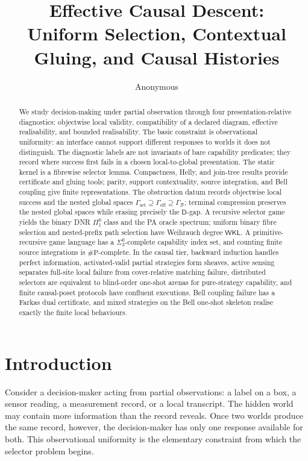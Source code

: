 \documentclass[11pt]{article}
\title{Effective Causal Descent:\\ Uniform Selection, Contextual Gluing, and Causal Histories}
\author{Anonymous}
\date{}
\theoremstyle{plain}
\theoremstyle{definition}
\theoremstyle{remark}
\begin{document}
\maketitle

\begin{abstract}
We study decision-making under partial observation through four
presentation-relative diagnostics: objectwise local validity, compatibility of a
declared diagram, effective realisability, and bounded realisability. The basic
constraint is observational uniformity: an interface cannot support different
responses to worlds it does not distinguish. The diagnostic labels are not
invariants of bare capability predicates; they record where success first fails
in a chosen local-to-global presentation. The static kernel is a fibrewise
selector lemma. Compactness, Helly, and join-tree results provide certificate and
gluing tools; parity, support contextuality, source integration, and Bell
coupling give finite representations. The obstruction datum records objectwise
local success and the nested global spaces
\(\Gamma_{\mathrm{set}}\supseteq\Gamma_{\mathrm{eff}}\supseteq
\Gamma_{\mathcal B}\); terminal compression preserves the nested global spaces
while erasing precisely the \(\mathsf D\)-gap. A recursive selector game yields
the binary DNR \(\Pi^0_1\) class and the PA oracle spectrum; uniform binary fibre
selection and nested-prefix path selection have Weihrauch degree \(\mathsf{WKL}\).
A primitive-recursive game language has a \(\Sigma^0_3\)-complete capability index
set, and counting finite source integrations is \(\#\mathrm P\)-complete. In the
causal tier, backward induction handles perfect information, activated-valid
partial strategies form sheaves, active sensing separates full-site local
failure from cover-relative matching failure, distributed selectors are
equivalent to blind-order one-shot arenas for pure-strategy capability, and
finite causal-poset protocols have confluent executions. Bell coupling failure
has a Farkas dual certificate, and mixed strategies on the Bell one-shot skeleton
realise exactly the finite local behaviours.
\end{abstract}

\tableofcontents

\section{Introduction}\label{sec:intro}

Consider a decision-maker acting from partial observations: a label on a box, a
sensor reading, a measurement record, or a local transcript. The hidden world may
contain more information than the record reveals. Once two worlds produce the
same record, however, the decision-maker has only one response available for
both. This observational uniformity is the elementary constraint from which the
selector problem begins.
\end{document}
